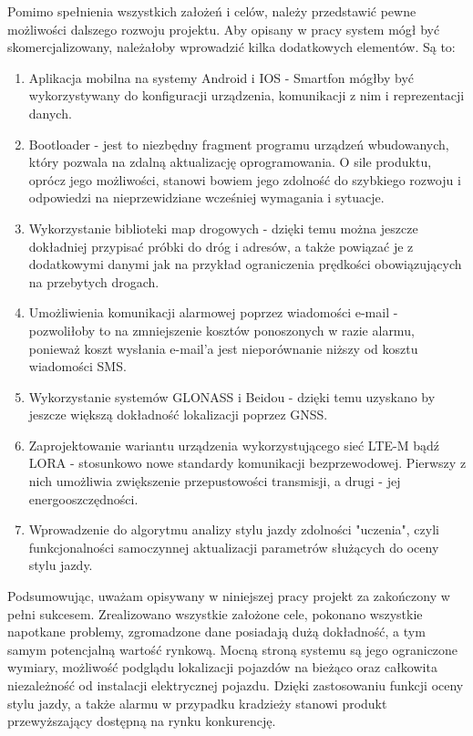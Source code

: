 Pomimo spełnienia wszystkich założeń i celów, należy przedstawić pewne możliwości dalszego rozwoju projektu. Aby opisany w pracy system mógł być skomercjalizowany, należałoby wprowadzić kilka dodatkowych elementów. Są to:

\begin{enumerate}
\item Aplikacja mobilna na systemy Android i IOS - Smartfon mógłby być wykorzystywany do konfiguracji urządzenia, komunikacji z nim i reprezentacji danych.
\item Bootloader - jest to niezbędny fragment programu urządzeń wbudowanych, który pozwala na zdalną aktualizację oprogramowania. O sile produktu, oprócz jego możliwości, stanowi bowiem jego zdolność do szybkiego rozwoju i odpowiedzi na nieprzewidziane wcześniej wymagania i sytuacje.
\item Wykorzystanie biblioteki map drogowych - dzięki temu można jeszcze dokładniej przypisać próbki do dróg i adresów, a także powiązać je z dodatkowymi danymi jak na przykład ograniczenia prędkości obowiązujących na przebytych drogach.
\item Umożliwienia komunikacji alarmowej poprzez wiadomości e-mail - pozwoliłoby to na zmniejszenie kosztów ponoszonych w razie alarmu, ponieważ koszt wysłania e-mail'a jest nieporównanie niższy od kosztu wiadomości SMS.
\item Wykorzystanie systemów GLONASS i Beidou - dzięki temu uzyskano by jeszcze większą dokładność lokalizacji poprzez GNSS.
\item Zaprojektowanie wariantu urządzenia wykorzystującego sieć LTE-M bądź LORA - stosunkowo nowe standardy komunikacji bezprzewodowej. Pierwszy z nich umożliwia zwiększenie przepustowości transmisji, a drugi - jej energooszczędności.
\item Wprowadzenie do algorytmu analizy stylu jazdy zdolności "uczenia", czyli funkcjonalności samoczynnej aktualizacji parametrów służących do oceny stylu jazdy.
\end{enumerate} 

\pagebreak
Podsumowując, uważam opisywany w niniejszej pracy projekt za zakończony w pełni sukcesem. Zrealizowano wszystkie założone cele, pokonano wszystkie napotkane problemy, zgromadzone dane posiadają dużą dokładność, a tym samym potencjalną wartość rynkową. Mocną stroną systemu są jego ograniczone wymiary, możliwość podglądu lokalizacji pojazdów na bieżąco oraz całkowita niezależność od instalacji elektrycznej pojazdu. Dzięki zastosowaniu funkcji oceny stylu jazdy, a także alarmu w przypadku kradzieży stanowi produkt przewyższający dostępną na rynku konkurencję.